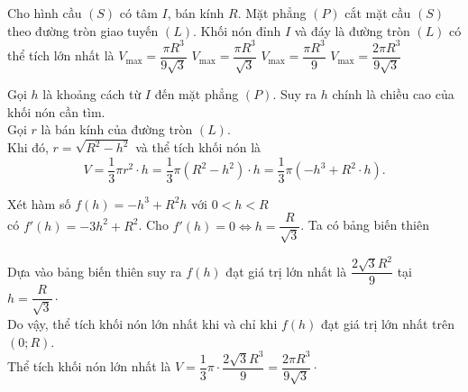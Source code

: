 \begin{ex}%
	[2H2K1-5]%
Cho hình cầu $ (S) $	 có tâm $ I $, bán kính $ R $. Mặt phẳng $ (P) $ cắt mặt cầu $ (S) $ theo đường tròn giao tuyến $ (L) $. Khối nón đỉnh $ I $ và đáy là đường tròn $ (L) $ có thể tích lớn nhất là 
	\choice
	{$ V_{\max} = \dfrac{\pi R^3}{9\sqrt{3}} $}
	{$ V_{\max} = \dfrac{\pi R^3}{\sqrt{3}} $}
	{$ V_{\max} = \dfrac{\pi R^3}{9} $}
	{\True $ V_{\max} = \dfrac{2\pi R^3}{9\sqrt{3}} $}
	\loigiai
{
\immini
{
	Gọi $ h $ là khoảng cách từ $ I $ đến mặt phẳng $ (P) $. Suy ra $ h $ chính là chiều cao của khối nón cần tìm.\\
	Gọi $ r $ là bán kính của đường tròn $ (L) $.\\
	Khi đó, $ r = \sqrt{R^2 - h^2} $ và thể tích khối nón là $$ V = \dfrac{1}{3} \pi r^2 \cdot h = \dfrac{1}{3} \pi \left(R^2 - h^2\right) \cdot h = \dfrac{1}{3} \pi \left(-h^3 +R^2 \cdot h\right). $$
	}
{
}
Xét hàm số $ f(h) = -h^3 +R^2 h $ với $ 0 < h < R $\\ có $ f'(h) = -3h^2 + R^2 $. Cho $ f'(h) = 0 \Leftrightarrow h = \dfrac{R}{\sqrt{3}} $. Ta có bảng biến thiên
\begin{center}
\end{center}
Dựa vào bảng biến thiên suy ra $ f(h) $ đạt giá trị lớn nhất là $ \dfrac{2\sqrt{3}R^2}{9} $ tại $ h = \dfrac{R}{\sqrt{3}} \cdot $\\
Do vậy, thể tích khối nón lớn nhất khi và chỉ khi $ f(h) $ đạt giá trị lớn nhất trên $ \left(0;R\right) $.\\
Thể tích khối nón lớn nhất là $ V = \dfrac{1}{3} \pi \cdot\dfrac{2\sqrt{3}R^3}{9} = \dfrac{2\pi R^3 }{9\sqrt{3}} \cdot $
}
	
\end{ex}


